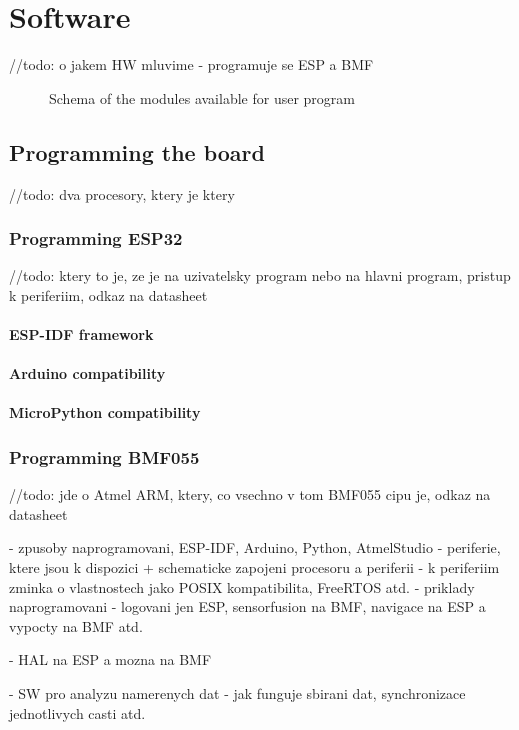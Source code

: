 \chapter{Software}

//todo: o jakem HW mluvime
- programuje se ESP a BMF

\begin{figure}
	\centering
	\label{fig:SWmodules}
	\caption{Schema of the modules available for user program}
\end{figure}

\section{Programming the board}
//todo: dva procesory, ktery je ktery

\subsection{Programming ESP32}
//todo: ktery to je, ze je na uzivatelsky program nebo na hlavni program, pristup k periferiim, odkaz na datasheet

\subsubsection{ESP-IDF framework}

\subsubsection{Arduino compatibility}

\subsubsection{MicroPython compatibility}

\subsection{Programming BMF055}
//todo: jde o Atmel ARM, ktery, co vsechno v tom BMF055 cipu je, odkaz na datasheet

- zpusoby naprogramovani, ESP-IDF, Arduino, Python, AtmelStudio
- periferie, ktere jsou k dispozici + schematicke zapojeni procesoru a periferii
- k periferiim zminka o vlastnostech jako POSIX kompatibilita, FreeRTOS atd.
- priklady naprogramovani - logovani jen ESP, sensorfusion na BMF, navigace na ESP a vypocty na BMF atd.

- HAL na ESP a mozna na BMF

- SW pro analyzu namerenych dat
- jak funguje sbirani dat, synchronizace jednotlivych casti atd.
